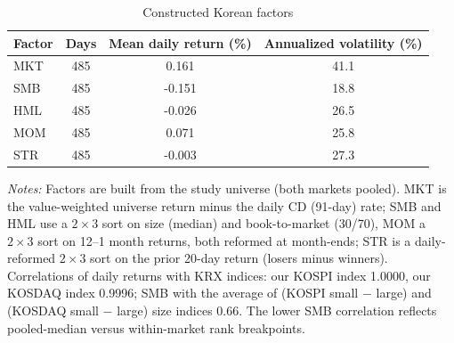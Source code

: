 \begin{table}[htbp]\centering
\caption{Constructed Korean factors}\label{tab:factors}
\small
\begin{tabular}{lccc}\toprule
Factor & Days & Mean daily return (\%) & Annualized volatility (\%) \\\midrule
MKT & 485 & 0.161 & 41.1 \\
SMB & 485 & -0.151 & 18.8 \\
HML & 485 & -0.026 & 26.5 \\
MOM & 485 & 0.071 & 25.8 \\
STR & 485 & -0.003 & 27.3 \\
\bottomrule\end{tabular}
\begin{minipage}{0.85\textwidth}\vspace{0.5em}\scriptsize
\textit{Notes:} Factors are built from the study universe (both markets pooled). MKT is the value-weighted universe return minus the daily CD (91-day) rate; SMB and HML use a $2\times3$ sort on size (median) and book-to-market (30/70), MOM a $2\times3$ sort on 12--1 month returns, both reformed at month-ends; STR is a daily-reformed $2\times3$ sort on the prior 20-day return (losers minus winners). Correlations of daily returns with KRX indices: our KOSPI index 1.0000, our KOSDAQ index 0.9996; SMB with the average of (KOSPI small $-$ large) and (KOSDAQ small $-$ large) size indices 0.66. The lower SMB correlation reflects pooled-median versus within-market rank breakpoints.
\end{minipage}\end{table}
